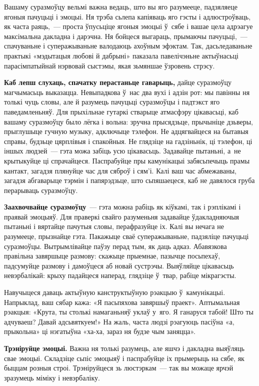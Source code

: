 Вашаму суразмоўцу вельмі важна ведаць, што вы яго разумееце, падзяляеце ягоныя пачуцьці і эмоцыі. Ня трэба сьлепа капіяваць яго гэсты і адлюстроўваць, як часта раяць,~--- проста ўпусьціце ягоныя эмоцыі ў~сябе і вашае цела адрэагуе максімальна дакладна і дарэчна. Ня бойцеся выгараць, прымаючы пачуцьці,~--- спачуваньне і суперажываньне валодаюць ахоўным эфэктам. Так, дасьледаваньне практыкі «мэдытацыя любові й дабрыні» паказала павелічэньне актыўнасьці парасімпатыйнай нэрвовай сыстэмы, якая зьмяншае ўзровень стрэсу.

\textbf{Каб лепш слухаць, спачатку перастаньце гаварыць,} дайце суразмоўцу магчымасьць выказацца. Невыпадкова ў~нас два вухі і адзін рот: мы павінны ня толькі чуць словы, але й разумець пачуцьці суразмоўцы і падтэкст яго паведамленьняў. Для прыхільнае гутаркі стварыце атмасфэру цікавасьці, каб вашаму суразмоўцу было лёгка і вольна: зручна прысядзьце, прычыніце дзьверы, прыглушыце гучную музыку, адключыце тэлефон. Не адцягвайцеся на бытавыя справы, будзьце цярплівыя і спакойныя. Не глядзіце на гадзіньнік, ці тэлефон, ці іншых людзей~--- гэта можа забіць усю цікавасьць. Задавайце пытаньні, а~не крытыкуйце ці спрачайцеся. Паспрабуйце пры камунікацыі забясьпечыць прамы кантакт, загадзя плянуйце час для сяброў і сям'і. Калі ваш час абмежаваны, загадзя абгаварыце тэрмін і папярэдзьце, што сьпяшаецеся, каб не давялося груба перарываць суразмоўцу.

\textbf{Заахвочвайце суразмоўцу}~--- гэта можна рабіць як кіўкамі, так і рэплікамі і праявай эмоцыяў. Для праверкі свайго разуменьня задавайце ўдакладняючыя пытаньні і вяртайце пачутыя словы, перафразуйце іх. Калі вы нечага не разумееце, прызнайце гэта. Пакажыце сваё суперажываньне, падзяліце пачуцьці суразмоўцы. Вытрымлівайце паўзу перад тым, як даць адказ. Абавязкова правільна завяршыце размову: скажыце прыемнае, пазычце посьпехаў, падсумуйце размову і дамоўцеся аб новай сустрэчы. Выяўляйце цікавасьць невэрбалікай: крыху падайцеся наперад, глядзіце ў~твар, рабіце мікрагэсты.

Навучыцеся даваць актыўную канструктыўную рэакцыю ў~камунікацыі. Напрыклад, ваш сябар кажа: «Я пасьпяхова завяршыў праект». Аптымальная рэакцыя: «Крута, ты столькі намаганьняў уклаў у~яго. Я ганаруся табой! Што ты адчуваеш? Давай адсьвяткуем!» На жаль, часта людзі рэагуюць пасіўна «а, прыкольна» ці нэгатыўна «ха-ха, зараз ня будзе чым заняцца».

\textbf{Трэніруйце эмоцыі.} Важна ня толькі разумець, але яшчэ і дакладна выяўляць свае эмоцыі. Складзіце сьпіс эмоцыяў і паспрабуйце іх прымерыць на сябе, як быццам розныя строі. Трэніруйцеся зь люстэркам~--- так вы можаце ярчэй зразумець міміку і невэрбаліку.

